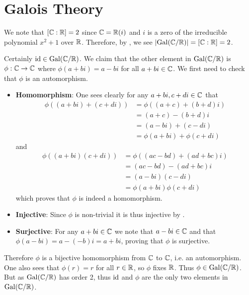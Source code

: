 \section{Galois Theory}
\begin{questions}
    \item \begin{partquestions}{\roman*}
        \item We note that $[\mathbb{C}:\mathbb{R}] = 2$ since $\mathbb{C} = \mathbb{R}(i)$ and $i$ is a zero of the irreducible polynomial $x^2 + 1$ over $\mathbb{R}$. Therefore, by , we see $|\mathrm{Gal}(\mathbb{C}/\mathbb{R})| = [\mathbb{C}:\mathbb{R}] = 2$.
        
        \item Certainly $\mathrm{id} \in \mathrm{Gal}(\mathbb{C}/\mathbb{R})$. We claim that the other element in $\mathrm{Gal}(\mathbb{C}/\mathbb{R})$ is $\phi: \mathbb{C} \to \mathbb{C}$ where $\phi(a+bi) = a-bi$ for all $a+bi \in \mathbb{C}$. We first need to check that $\phi$ is an automorphism.
        \begin{itemize}
            \item \textbf{Homomorphism}: One sees clearly for any $a+bi, c+di \in \mathbb{C}$ that
            \begin{align*}
                \phi((a+bi)+(c+di)) &= \phi((a+c)+(b+d)i)\\
                &= (a+c)-(b+d)i\\
                &= (a-bi) + (c-di)\\
                &= \phi(a+bi) + \phi(c+di)
            \end{align*}
            and
            \begin{align*}
                \phi((a+bi)(c+di)) &= \phi((ac-bd) + (ad+bc)i)\\
                &= (ac-bd) - (ad+bc)i\\
                &= (a-bi)(c-di)\\
                &= \phi(a+bi)\phi(c+di)
            \end{align*}
            which proves that $\phi$ is indeed a homomorphism.

            \item \textbf{Injective}: Since $\phi$ is non-trivial it is thus injective by .
            
            \item \textbf{Surjective}: For any $a + bi \in \mathbb{C}$ we note that $a - bi \in \mathbb{C}$ and that $\phi(a - bi) = a - (-b)i = a+bi$, proving that $\phi$ is surjective.
        \end{itemize}
        Therefore $\phi$ is a bijective homomorphism from $\mathbb{C}$ to $\mathbb{C}$, i.e. an automorphism. One also sees that $\phi(r) = r$ for all $r \in \mathbb{R}$, so $\phi$ fixes $\mathbb{R}$. Thus $\phi \in \mathrm{Gal}(\mathbb{C}/\mathbb{R})$. But as $\mathrm{Gal}(\mathbb{C}/\mathbb{R})$ has order 2, thus $\mathrm{id}$ and $\phi$ are the only two elements in $\mathrm{Gal}(\mathbb{C}/\mathbb{R})$.
    \end{partquestions}


\end{questions}
